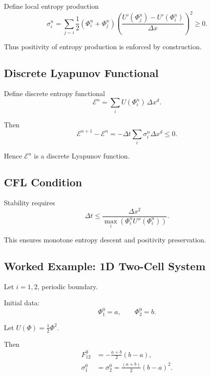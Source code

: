 \documentclass[11pt]{article}
\begin{document}
Define local entropy production
\begin{equation}
\sigma_i^n
=
\sum_{j \sim i}
\frac{1}{2}
\left(
\Phi_i^n + \Phi_j^n
\right)
\left(
\frac{U'(\Phi_j^n)-U'(\Phi_i^n)}{\Delta x}
\right)^2
\ge 0.
\end{equation}

Thus positivity of entropy production is enforced by construction.

\subsection*{Discrete Lyapunov Functional}

Define discrete entropy functional
\begin{equation}
\mathcal{E}^n
=
\sum_i U(\Phi_i^n)\,\Delta x^d.
\end{equation}

Then
\begin{equation}
\mathcal{E}^{n+1} - \mathcal{E}^n
=
- \Delta t
\sum_i
\sigma_i^n
\Delta x^d
\le 0.
\end{equation}

Hence $\mathcal{E}^n$ is a discrete Lyapunov function.

\subsection*{CFL Condition}

Stability requires
\begin{equation}
\Delta t
\le
\frac{\Delta x^2}{\max_i \left(\Phi_i^n U''(\Phi_i^n)\right)}.
\end{equation}

This ensures monotone entropy descent and positivity preservation.

\subsection*{Worked Example: 1D Two-Cell System}

Let $i=1,2$, periodic boundary.

Initial data:
\begin{equation}
\Phi_1^0 = a, \qquad \Phi_2^0 = b.
\end{equation}

Let $U(\Phi)=\frac{1}{2}\Phi^2$.

Then
\begin{align}
F_{12}^0 &= -\frac{a+b}{2}(b-a), \\
\sigma_1^0 &= \sigma_2^0 = \frac{(a+b)}{2}(b-a)^2.
\end{align}
\end{document}
